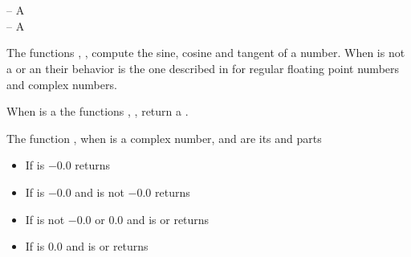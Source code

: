 \documentclass[../Exponentials-Logarithms-Trigonometry.tex]{subfiles}
\begin{document}

\DSyntax{}

  \RArrow {}\\
  \RArrow {}\\
  \RArrow {}

\DArgsNValues{}

 -- A \\
 -- A 

\DDescription{}

The functions , ,  compute the sine, cosine
and tangent of a number. When  is not a  or an
 their behavior is the one described in
\cite{1996:ANSIHyperSpec} for regular floating point numbers and complex
numbers.

\noindent
When  is a  the functions ,
,  return a .

\noindent
The function , when  is a complex number, 
and  are its  and  parts
\begin{itemize}
\item If  is $-0.0$ returns 
\item If  is $-0.0$ and  is not
  $-0.0$ returns \code{))))}
\item If  is not $-0.0$ or $0.0$ and
   is  or  returns
   \code{)} \code{))}
\item If  is $0.0$ and  is
   or  returns \code{)}
\end{itemize}
\end{document}
